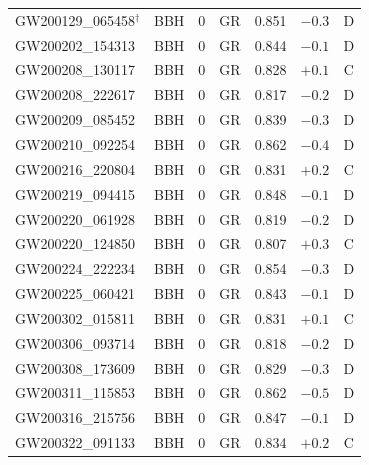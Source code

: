 \documentclass[11pt,a4paper, english]{book}
\theoremstyle{plain}
\theoremstyle{definition}
\numberwithin{equation}{chapter}
\numberwithin{figure}{chapter}
\numberwithin{table}{chapter}
\begin{document}
\begin{landscape}
{\begin{longtable}{@{}p{4.5cm}p{0.9cm}p{1.5cm}p{2.8cm}ccc@{}}
GW200129\_065458$^\dagger$ & BBH  & 0  & GR             & 0.851 & $-0.3$ & D \\
GW200202\_154313           & BBH  & 0  & GR             & 0.844 & $-0.1$ & D \\
GW200208\_130117           & BBH  & 0  & GR             & 0.828 & $+0.1$ & C \\
GW200208\_222617           & BBH  & 0  & GR             & 0.817 & $-0.2$ & D \\
GW200209\_085452           & BBH  & 0  & GR             & 0.839 & $-0.3$ & D \\
GW200210\_092254           & BBH  & 0  & GR             & 0.862 & $-0.4$ & D \\
GW200216\_220804           & BBH  & 0  & GR             & 0.831 & $+0.2$ & C \\
GW200219\_094415           & BBH  & 0  & GR             & 0.848 & $-0.1$ & D \\
GW200220\_061928           & BBH  & 0  & GR             & 0.819 & $-0.2$ & D \\
GW200220\_124850           & BBH  & 0  & GR             & 0.807 & $+0.3$ & C \\
GW200224\_222234           & BBH  & 0  & GR             & 0.854 & $-0.3$ & D \\
GW200225\_060421           & BBH  & 0  & GR             & 0.843 & $-0.1$ & D \\
GW200302\_015811           & BBH  & 0  & GR             & 0.831 & $+0.1$ & C \\
GW200306\_093714           & BBH  & 0  & GR             & 0.818 & $-0.2$ & D \\
GW200308\_173609           & BBH  & 0  & GR             & 0.829 & $-0.3$ & D \\
GW200311\_115853           & BBH  & 0  & GR             & 0.862 & $-0.5$ & D \\
GW200316\_215756           & BBH  & 0  & GR             & 0.847 & $-0.1$ & D \\
GW200322\_091133           & BBH  & 0  & GR             & 0.834 & $+0.2$ & C \\
\end{longtable}
\vspace{2pt}
\normalsize
}

\end{landscape}
\rhead{\theauthor\\\@titulacion}
\rfoot{\thepage}
\makeatother


\end{document}
